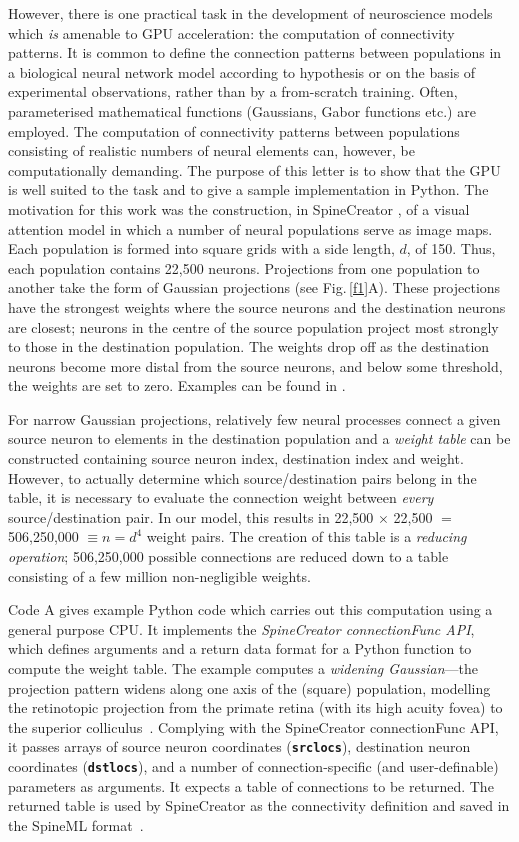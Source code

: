 \documentclass[12pt, a4paper]{article}
\newcommand{\code}[1]{\textbf{\texttt{#1}}}
\begin{document}
However, there is one practical task in the development of neuroscience models
which \emph{is} amenable to GPU acceleration: the computation of connectivity
patterns. It is common to define the connection patterns between populations
in a biological neural network model according to hypothesis or on the basis
of experimental observations, rather than by a from-scratch training. Often,
parameterised mathematical functions (Gaussians, Gabor functions etc.) are
employed. The computation of connectivity patterns between populations
consisting of realistic numbers of neural elements can, however, be
computationally demanding. The purpose of this letter is to show that the GPU
is well suited to the task and to give a sample implementation in Python. The
motivation for this work was the construction, in
SpineCreator \cite{cope_spinecreator_2015,cope_spinecreator:_2016}, of a
visual attention model in which a number of neural populations serve as image
maps. Each population is formed into square grids with a side length, $d$, of
150. Thus, each population contains 22,500 neurons. Projections from one
population to another take the form of Gaussian projections (see
Fig.\,\ref{f1}A). These projections have the strongest weights where the
source neurons and the destination neurons are closest; neurons in the centre
of the source population project most strongly to those in the destination
population. The weights drop off as the destination neurons become more distal
from the source neurons, and below some threshold, the weights are set to
zero. Examples can be found in \cite{james_integrating_2018}.

For narrow Gaussian projections, relatively few neural processes connect a
given source neuron to elements in the destination population and
a \emph{weight table} can be constructed containing source neuron index,
destination index and weight. However, to actually determine which
source/destination pairs belong in the table, it is necessary to evaluate the
connection weight between \emph{every} source/destination pair. In our model,
this results in 22,500 $\times$ 22,500 $=$ 506,250,000 $\equiv n = d^4$ weight
pairs.  The creation of this table is a \emph{reducing operation}; 506,250,000
possible connections are reduced down to a table consisting of a few
million non-negligible weights.

Code A gives example Python code which carries out this computation using
a general purpose CPU. It implements the \emph{SpineCreator connectionFunc
API}, which defines arguments and a return data format for a Python function
to compute the weight table. The example computes a \emph{widening
Gaussian}---the projection pattern widens along one axis of the (square)
population, modelling the retinotopic projection from the primate retina (with
its high acuity fovea) to the superior
colliculus~\cite{james_integrating_2018}. Complying with the SpineCreator
connectionFunc API, it passes arrays of source neuron coordinates
(\code{srclocs}), destination neuron coordinates (\code{dstlocs}), and a
number of connection-specific (and user-definable) parameters as arguments. It
expects a table of connections to be returned. The returned table is used by
SpineCreator as the connectivity definition and saved in the SpineML
format~\cite{cope_spineml_2014}.
\end{document}
